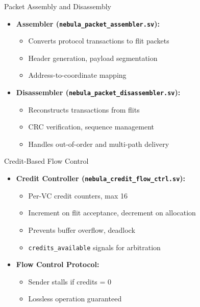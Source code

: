 \documentclass{beamer}
\begin{document}
\begin{frame}{Packet Assembly and Disassembly}
  \begin{itemize}
    \item \textbf{Assembler (\texttt{nebula\_packet\_assembler.sv}):}
      \begin{itemize}
        \item Converts protocol transactions to flit packets
        \item Header generation, payload segmentation
        \item Address-to-coordinate mapping
      \end{itemize}
    \item \textbf{Disassembler (\texttt{nebula\_packet\_disassembler.sv}):}
      \begin{itemize}
        \item Reconstructs transactions from flits
        \item CRC verification, sequence management
        \item Handles out-of-order and multi-path delivery
      \end{itemize}
  \end{itemize}
\end{frame}

\begin{frame}{Credit-Based Flow Control}
  \begin{itemize}
    \item \textbf{Credit Controller (\texttt{nebula\_credit\_flow\_ctrl.sv}):}
      \begin{itemize}
        \item Per-VC credit counters, max 16
        \item Increment on flit acceptance, decrement on allocation
        \item Prevents buffer overflow, deadlock
        \item \texttt{credits\_available} signals for arbitration
      \end{itemize}
    \item \textbf{Flow Control Protocol:}
      \begin{itemize}
        \item Sender stalls if credits = 0
        \item Lossless operation guaranteed
      \end{itemize}
  \end{itemize}
\end{frame}
\end{document}
